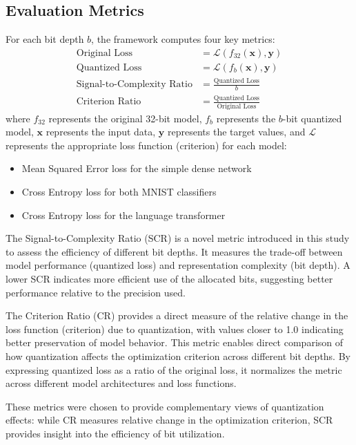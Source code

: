 \documentclass[twocolumn]{article}
\begin{document}
\subsection{Evaluation Metrics}
For each bit depth $b$, the framework computes four key metrics:
\begin{align}
\text{Original Loss} &= \mathcal{L}(f_{32}(\mathbf{x}), \mathbf{y}) \nonumber \\
\text{Quantized Loss} &= \mathcal{L}(f_b(\mathbf{x}), \mathbf{y}) \nonumber \\
\text{Signal-to-Complexity Ratio} &= \frac{\text{Quantized Loss}}{b} \nonumber \\
\text{Criterion Ratio} &= \frac{\text{Quantized Loss}}{\text{Original Loss}}
\end{align}
where $f_{32}$ represents the original 32-bit model, $f_b$ represents the $b$-bit quantized model, $\mathbf{x}$ represents the input data, $\mathbf{y}$ represents the target values, and $\mathcal{L}$ represents the appropriate loss function (criterion) for each model:
\begin{itemize}
\item Mean Squared Error loss for the simple dense network
\item Cross Entropy loss for both MNIST classifiers
\item Cross Entropy loss for the language transformer
\end{itemize}
The Signal-to-Complexity Ratio (SCR) is a novel metric introduced in this study
to assess the efficiency of different bit depths. It measures the trade-off
between model performance (quantized loss) and representation complexity (bit
depth). A lower SCR indicates more efficient use of the allocated bits,
suggesting better performance relative to the precision used.

The Criterion Ratio (CR) provides a direct measure of the relative change in the
loss function (criterion) due to quantization, with values closer to 1.0
indicating better preservation of model behavior. This metric enables direct
comparison of how quantization affects the optimization criterion across
different bit depths. By expressing quantized loss as a ratio of the original
loss, it normalizes the metric across different model architectures and loss
functions.

These metrics were chosen to provide complementary views of quantization
effects: while CR measures relative change in the optimization criterion, SCR
provides insight into the efficiency of bit utilization.
\end{document}
